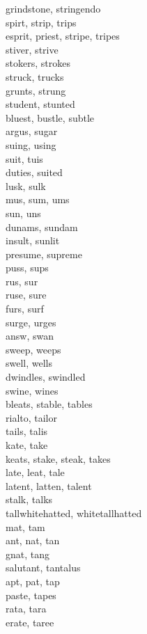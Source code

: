 grindstone, stringendo\\
spirt, strip, trips\\
esprit, priest, stripe, tripes\\
stiver, strive\\
stokers, strokes\\
struck, trucks\\
grunts, strung\\
student, stunted\\
bluest, bustle, subtle\\
argus, sugar\\
suing, using\\
suit, tuis\\
duties, suited\\
lusk, sulk\\
mus, sum, ums\\
sun, uns\\
dunams, sundam\\
insult, sunlit\\
presume, supreme\\
puss, sups\\
rus, sur\\
ruse, sure\\
furs, surf\\
surge, urges\\
answ, swan\\
sweep, weeps\\
swell, wells\\
dwindles, swindled\\
swine, wines\\
bleats, stable, tables\\
rialto, tailor\\
tails, talis\\
kate, take\\
keats, stake, steak, takes\\
late, leat, tale\\
latent, latten, talent\\
stalk, talks\\
tallwhitehatted, whitetallhatted\\
mat, tam\\
ant, nat, tan\\
gnat, tang\\
salutant, tantalus\\
apt, pat, tap\\
paste, tapes\\
rata, tara\\
erate, taree\\
